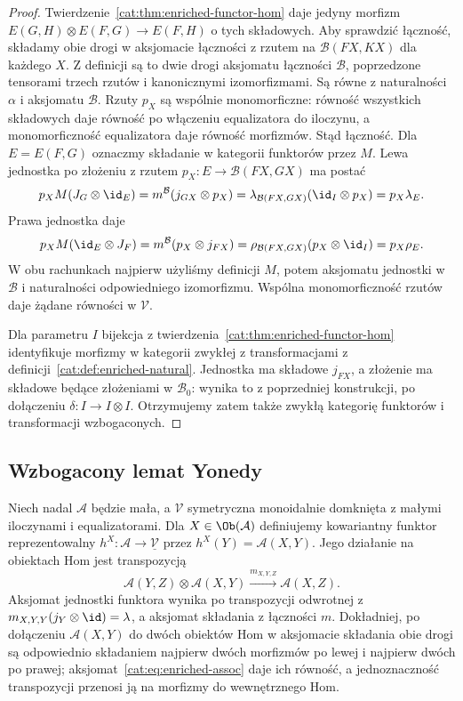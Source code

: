 \begin{proof}
Twierdzenie~\ref{cat:thm:enriched-functor-hom} daje jedyny morfizm $E(G,H)\otimes E(F,G)\to E(F,H)$ o tych składowych. Aby sprawdzić łączność, składamy obie drogi w aksjomacie łączności z rzutem na $\mathcal B(FX,KX)$ dla każdego $X$. Z definicji są to dwie drogi aksjomatu łączności $\mathcal B$, poprzedzone tensorami trzech rzutów i kanonicznymi izomorfizmami. Są równe z naturalności $\alpha$ i aksjomatu $\mathcal B$. Rzuty $p_X$ są wspólnie monomorficzne: równość wszystkich składowych daje równość po włączeniu equalizatora do iloczynu, a monomorficzność equalizatora daje równość morfizmów. Stąd łączność. Dla $E=E(F,G)$ oznaczmy składanie w kategorii funktorów przez $M$. Lewa jednostka po złożeniu z rzutem $p_X:E\to\mathcal B(FX,GX)$ ma postać
\[
 p_XM(J_G\otimes\id_E)=m^{\mathcal B}(j_{GX}\otimes p_X)
 =\lambda_{\mathcal B(FX,GX)}(\id_I\otimes p_X)
 =p_X\lambda_E.
\]
Prawa jednostka daje
\[
 p_XM(\id_E\otimes J_F)=m^{\mathcal B}(p_X\otimes j_{FX})
 =\rho_{\mathcal B(FX,GX)}(p_X\otimes\id_I)
 =p_X\rho_E.
\]
W obu rachunkach najpierw użyliśmy definicji $M$, potem aksjomatu jednostki w $\mathcal B$ i naturalności odpowiedniego izomorfizmu. Wspólna monomorficzność rzutów daje żądane równości w $\mathcal V$.

Dla parametru $I$ bijekcja z twierdzenia~\ref{cat:thm:enriched-functor-hom} identyfikuje morfizmy w kategorii zwykłej z transformacjami z definicji~\ref{cat:def:enriched-natural}. Jednostka ma składowe $j_{FX}$, a złożenie ma składowe będące złożeniami w $\mathcal B_0$: wynika to z poprzedniej konstrukcji, po dołączeniu $\delta:I\to I\otimes I$. Otrzymujemy zatem także zwykłą kategorię funktorów i transformacji wzbogaconych.
\end{proof}

\subsection{Wzbogacony lemat Yonedy}

Niech nadal $\mathcal A$ będzie mała, a $\mathcal V$ symetryczna monoidalnie domknięta z małymi iloczynami i equalizatorami. Dla $X\in\Ob(\mathcal A)$ definiujemy kowariantny funktor reprezentowalny $h^X:\mathcal A\to\underline{\mathcal V}$ przez $h^X(Y)=\mathcal A(X,Y)$. Jego działanie na obiektach Hom jest transpozycją
\[
 \mathcal A(Y,Z)\otimes\mathcal A(X,Y)
 \xrightarrow{m_{X,Y,Z}}\mathcal A(X,Z).
\]
Aksjomat jednostki funktora wynika po transpozycji odwrotnej z $m_{X,Y,Y}(j_Y\otimes\id)=\lambda$, a aksjomat składania z łączności $m$. Dokładniej, po dołączeniu $\mathcal A(X,Y)$ do dwóch obiektów Hom w aksjomacie składania obie drogi są odpowiednio składaniem najpierw dwóch morfizmów po lewej i najpierw dwóch po prawej; aksjomat~\eqref{cat:eq:enriched-assoc} daje ich równość, a jednoznaczność transpozycji przenosi ją na morfizmy do wewnętrznego Hom.

